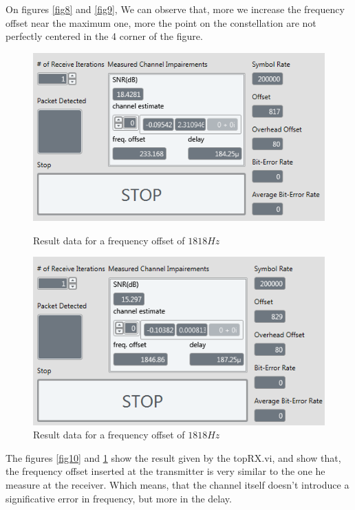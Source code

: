 \documentclass[frenchb, oneside, headings=normal]{scrartcl}
\begin{document}
On figures \ref{fig8} and \ref{fig9}, We can observe that, more we increase the frequency offset near the maximum one, more the point on the constellation are not perfectly centered in the 4 corner of the figure.

\begin{figure}[!ht]
    \begin{minipage}[b]{0.48\linewidth}
        \centering \includegraphics[scale=0.7]{img/USRP_value_227.PNG}
     \caption{Result data for a frequency offset of $1818 Hz$}
     \label{fig10}
    \end{minipage}\hfill
    \begin{minipage}[b]{0.48\linewidth}
         \centering \includegraphics[scale=0.7]{img/USRP_value_1818.PNG}
          \caption{Result data for a frequency offset of $1818 Hz$}
          \label{fig11}
    \end{minipage}  
\end{figure}

The figures \ref{fig10} and \ref{fig11} show the result given by the topRX.vi, and show that, the frequency offset inserted at the transmitter is very similar to the one he measure at the receiver. Which means, that the channel itself doesn't introduce a significative error in frequency, but more in the delay.
\end{document}
